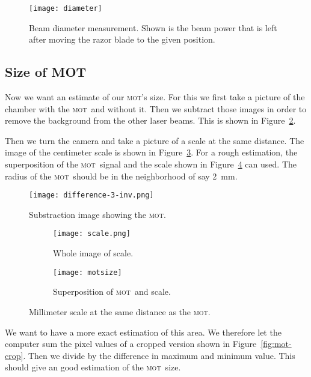 \documentclass[11pt, english, fleqn, DIV=15, headinclude, BCOR=2cm]{scrreprt}
\newcommand\mot{\textsc{mot}}
\begin{document}
\begin{figure}
    \centering
    \texttt{[image: diameter]}
    \caption{%
        Beam diameter measurement. Shown is the beam power that is left after
        moving the razor blade to the given position.
    }
    \label{fig:diameter}
\end{figure}


\subsection{Size of MOT}

Now we want an estimate of our \mot's size. For this we first take a picture of
the chamber with the \mot\ and without it. Then we subtract those images in
order to remove the background from the other laser beams. This is shown in
Figure~\ref{fig:difference-3-inv}.

Then we turn the camera and take a picture of a scale at the same distance. The
image of the centimeter scale is shown in Figure~\ref{fig:scale}. For a rough
estimation, the superposition of the \mot\ signal and the scale shown in
Figure~\ref{fig:motsize} can used. The radius of the \mot\ should be in the
neighborhood of say \SI{2}{\milli\meter}.

\begin{figure}
    \centering
    \texttt{[image: difference-3-inv.png]}
    \caption{Substraction image showing the \mot.}
    \label{fig:difference-3-inv}
\end{figure}

\begin{figure}
    \begin{subfigure}{.45\textwidth}
        \centering
        \texttt{[image: scale.png]}
        \caption{Whole image of scale.}
        \label{fig:scale}
    \end{subfigure}
    \hfill
    \begin{subfigure}{.45\textwidth}
        \centering
        \texttt{[image: motsize]}
        \caption{Superposition of \mot\ and scale.}
        \label{fig:motsize}
    \end{subfigure}
    \caption{Millimeter scale at the same distance as the \mot.}
    \label{fig:mot_size}
\end{figure}

We want to have a more exact estimation of this area. We therefore let the
computer sum the pixel values of a cropped version shown in
Figure~\ref{fig:mot-crop}. Then we divide by the difference in maximum and
minimum value. This should give an good estimation of the \mot\ size.
\end{document}
